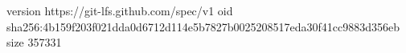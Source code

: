 version https://git-lfs.github.com/spec/v1
oid sha256:4b159f203f021dda0d6712d114e5b7827b0025208517eda30f41cc9883d356eb
size 357331
